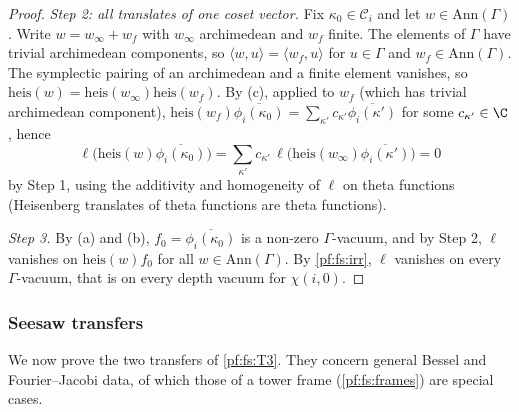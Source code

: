 \begin{proof}
\emph{Step 2: all translates of one coset vector.} Fix $\kappa_0\in\mathcal C_i$ and let $w\in\mathrm{Ann}(\Gamma)$. Write
$w=w_\infty+w_f$ with $w_\infty$ archimedean and $w_f$ finite. The elements of $\Gamma$ have trivial archimedean components, so
$\langle w,u\rangle=\langle w_f,u\rangle$ for $u\in\Gamma$ and $w_f\in\mathrm{Ann}(\Gamma)$. The symplectic pairing of an archimedean and a
finite element vanishes, so $\mathrm{heis}(w)=\mathrm{heis}(w_\infty)\mathrm{heis}(w_f)$. By (c), applied to $w_f$ (which has trivial archimedean
component),
$\mathrm{heis}(w_f)\overline{\phi_i(\kappa_0)}=\sum_{\kappa'}c_{\kappa'}\overline{\phi_i(\kappa')}$ for some $c_{\kappa'}\in\C$, hence
\[
\ell\bigl(\mathrm{heis}(w)\overline{\phi_i(\kappa_0)}\bigr)=\sum_{\kappa'}c_{\kappa'}\,\ell\bigl(\mathrm{heis}(w_\infty)\overline{\phi_i(\kappa')}\bigr)=0
\]
by Step 1, using the additivity and homogeneity of $\ell$ on theta functions (Heisenberg translates of theta functions are theta
functions).

\emph{Step 3.} By (a) and (b), $f_0=\overline{\phi_i(\kappa_0)}$ is a non-zero $\Gamma$-vacuum, and by Step 2, $\ell$ vanishes on
$\mathrm{heis}(w)f_0$ for all $w\in\mathrm{Ann}(\Gamma)$. By \cref{pf:fs:irr}, $\ell$ vanishes on every $\Gamma$-vacuum, that is on every depth
vacuum for $\chi(i,0)$.
\end{proof}

\subsubsection{Seesaw transfers}

We now prove the two transfers of \ref{pf:fs:T3}. They concern general Bessel and Fourier--Jacobi data, of which those of a tower frame
(\cref{pf:fs:frames}) are special cases.

